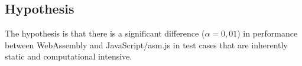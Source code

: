





\subsection{Hypothesis}

The hypothesis is that there is a significant difference ($\alpha = 0,01$) in performance between WebAssembly and JavaScript/asm.js in test cases that are inherently static and computational intensive.



